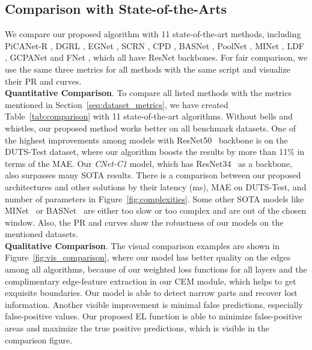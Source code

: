 \documentclass[10pt,twocolumn,letterpaper]{article}
\begin{document}
\subsection{Comparison with State-of-the-Arts}
We compare our proposed algorithm with 11 state-of-the-art methods, including PiCANet-R \cite{PiCANet}, DGRL \cite{DGRL}, EGNet \cite{EGNet}, SCRN \cite{SCRN}, CPD \cite{CPD}, BASNet \cite{BASNet}, PoolNet \cite{PoolNet}, MINet \cite{MINet-CVPR2020}, LDF \cite{LDF}, GCPANet \cite{GCPANet} and FNet \cite{F3Net}, which all have ResNet backbones. For fair comparison, we use the same three metrics for all methods with the same script and visualize their PR and  curves. \\
\textbf{Quantitative Comparison}. To compare all listed methods with the metrics mentioned in Section~\ref{seq:dataset_metrics}, we have created Table~\ref{tab:comparison} with 11 state-of-the-art algorithms. Without bells and whistles, our proposed method works better on all benchmark datasets. One of the highest improvements among models with ResNet50~\cite{ResNet} backbone is on the DUTS-Test dataset, where our algorithm boosts the results by more than 11\% in terms of the MAE. Our \textit{CNet-C1} model, which has ResNet34~\cite{ResNet} as a backbone, also surpasses many SOTA results. There is a comparison between our proposed architectures and other solutions by their latency (ms), MAE on DUTS-Test, and number of parameters in Figure~\ref{fig:complexities}. Some other SOTA models like MINet~\cite{MINet-CVPR2020} or BASNet~\cite{BASNet} are either too slow or too complex and are out of the chosen window. Also, the PR and  curves show the robustness of our models on the mentioned datasets. \\
\textbf{Qualitative Comparison}. The visual comparison examples are shown in Figure~\ref{fig:vis_comparison}, where our model has better quality on the edges among all algorithms, because of our weighted loss functions for all layers and the complimentary edge-feature extraction in our CEM module, which helps to get exquisite boundaries. Our model is able to detect narrow parts and recover lost information. Another visible improvement is minimal false predictions, especially false-positive values. Our proposed EL function is able to minimize false-positive areas and maximize the true positive predictions, which is visible in the comparison figure.
\end{document}

